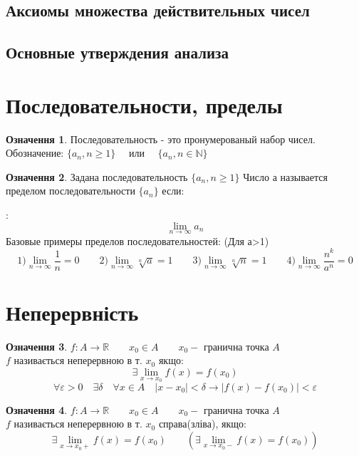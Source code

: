\documentclass[14pt,a4paper]{scrartcl}
\theoremstyle{definition}
\newtheorem{defo}{Означення}[section]
\theoremstyle{remark}
\theoremstyle{definition}
\theoremstyle{definition}
\begin{document}
\subsection{Аксиомы множества действительных чисел}
\subsection{Основные утверждения анализа}
\section{Последовательности, пределы}
\begin{defo}
Последовательность - это пронумерованый набор чисел. \\ Обозначение: $\lbrace a_n, n \geq 1\rbrace \quad$ или $\quad\lbrace a_n, n \in \mathbb{N}\rbrace$
\end{defo}
\begin{defo}
Задана последовательность $\lbrace a_n, n \geq 1\rbrace$
Число а называется пределом последовательности $\lbrace a_n\rbrace$ если:
\noindent{}
\end{defo}
:$$\lim_{n\to\infty}{a_n}$$
Базовые примеры пределов последовательностей: (Для а>1)\\
$$
1) \lim_{n\to\infty}{\frac{1}{n}} = 0 \qquad
2) \lim_{n\to\infty}{\sqrt[n]{a}} = 1 \qquad
3) \lim_{n\to\infty}{\sqrt[n]{n}} = 1 \qquad
4) \lim_{n\to\infty}{\frac{n^k}{a^n}} = 0
$$
\pagebreak

\section{Неперервність}

\begin{defo}
  $f: A \to \mathbb{R} \qquad x_0 \in A \qquad x_0 -$ гранична точка $A$\\
  $f$ називається неперервною в т. $x_0$ якщо:
  $$\exists  \lim\limits_{x\to x_0}{f(x)} = f(x_0)$$
  $$\forall \varepsilon >0 \quad \exists \delta \quad \forall x \in A \quad |x - x_0|<\delta \rightarrow |f(x) - f(x_0)|<\varepsilon $$
\end{defo}

\begin{defo}
$f: A \to \mathbb{R} \qquad x_0 \in A \qquad x_0 -$ гранична точка $A$\\
$f$ називається неперервною в т. $x_0$ справа(зліва), якщо:
$$\exists  \lim\limits_{x\to x_0+}{f(x)} = f(x_0) \qquad
(\exists  \lim\limits_{x\to x_0 -}{f(x)} = f(x_0))$$
\end{defo}
\end{document}
